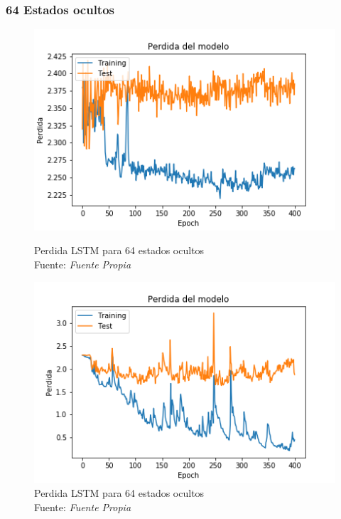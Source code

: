 \subsubsection{64 Estados ocultos}\label{64statecost}
\begin{figure}[H]
	\centering
	\includegraphics[width=0.7\linewidth]{Figures/rnn_64_cost}
	\caption{Perdida LSTM para 64 estados ocultos\\ Fuente: {\textit{Fuente Propia}}}
	\label{fig:rnn64cost}

	\centering
	\includegraphics[width=0.7\linewidth]{Figures/lstm13_64_cost}
	\caption{Perdida LSTM  para 64 estados ocultos \\ Fuente: {\textit{Fuente Propia}}}
	\label{fig:lstm1364cost}
\end{figure}

